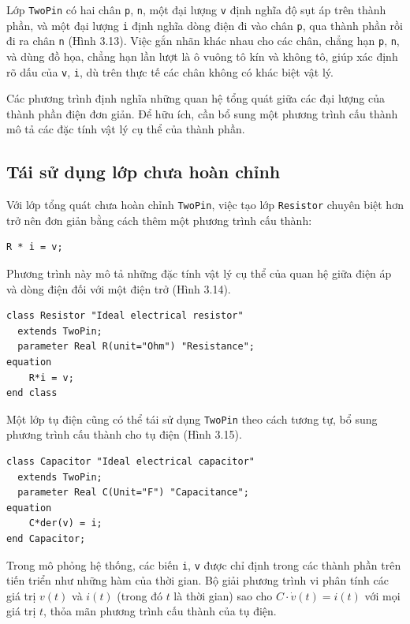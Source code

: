 Lớp \texttt{TwoPin} có hai chân \texttt{p}, \texttt{n}, một đại lượng \texttt{v} định nghĩa độ sụt áp trên thành phần, và một đại lượng \texttt{i} định nghĩa dòng điện đi vào chân \texttt{p}, qua thành phần rồi đi ra chân \texttt{n} (Hình 3.13). Việc gắn nhãn khác nhau cho các chân, chẳng hạn \texttt{p}, \texttt{n}, và dùng đồ họa, chẳng hạn lần lượt là ô vuông tô kín và không tô, giúp xác định rõ dấu của \texttt{v}, \texttt{i}, dù trên thực tế các chân không có khác biệt vật lý.


Các phương trình định nghĩa những quan hệ tổng quát giữa các đại lượng của thành phần điện đơn giản. Để hữu ích, cần bổ sung một phương trình cấu thành mô tả các đặc tính vật lý cụ thể của thành phần.

\subsection{Tái sử dụng lớp chưa hoàn chỉnh}
Với lớp tổng quát chưa hoàn chỉnh \texttt{TwoPin}, việc tạo lớp \texttt{Resistor} chuyên biệt hơn trở nên đơn giản bằng cách thêm một phương trình cấu thành:
\begin{verbatim}
R * i = v;
\end{verbatim}
Phương trình này mô tả những đặc tính vật lý cụ thể của quan hệ giữa điện áp và dòng điện đối với một điện trở (Hình 3.14).
\begin{verbatim}
class Resistor "Ideal electrical resistor"
  extends TwoPin;
  parameter Real R(unit="Ohm") "Resistance";
equation
    R*i = v;
end class
\end{verbatim}
Một lớp tụ điện cũng có thể tái sử dụng \texttt{TwoPin} theo cách tương tự, bổ sung phương trình cấu thành cho tụ điện (Hình 3.15).
\begin{verbatim}
class Capacitor "Ideal electrical capacitor"
  extends TwoPin;
  parameter Real C(Unit="F") "Capacitance";
equation
    C*der(v) = i;
end Capacitor;
\end{verbatim}

Trong mô phỏng hệ thống, các biến \texttt{i}, \texttt{v} được chỉ định trong các thành phần trên tiến triển như những hàm của thời gian. Bộ giải phương trình vi phân tính các giá trị $v(t)$ và $i(t)$ (trong đó $t$ là thời gian) sao cho $C\cdot\dot{v}(t)=i(t)$ với mọi giá trị $t$, thỏa mãn phương trình cấu thành của tụ điện.

